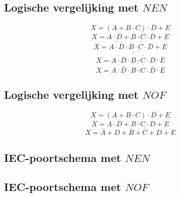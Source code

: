 \documentclass[11pt, a4paper]{report}
\begin{document}
\subsection*{Logische vergelijking met $NEN$}

\begin{equation*}
X = (A + B\cdot C)\cdot \overline{D} + E
\end{equation*}
\begin{equation*}
X = A \cdot \overline{D} + B \cdot C \cdot \overline{D} + E
\end{equation*}
\begin{equation*}
X = \overline{\overline{A \cdot \overline{D}}\cdot \overline{B \cdot C \cdot \overline{D}}}+ E
\end{equation*}
\begin{equation*}
X = \overline{\overline{\overline{\overline{A \cdot \overline{D}}\cdot \overline{B \cdot C \cdot \overline{D}}}} \cdot \overline{E}}
\end{equation*}
\begin{equation*}
X = \overline{\overline{A \cdot \overline{D}}\cdot \overline{B \cdot C \cdot \overline{D}} \cdot \overline{E}}
\end{equation*}

\subsection*{Logische vergelijking met $NOF$}
\begin{equation*}
X = (A + B\cdot C)\cdot \overline{D} + E
\end{equation*}
\begin{equation*}
X = A \cdot \overline{D} + B \cdot C \cdot \overline{D} + E
\end{equation*}
\begin{equation*}
X = \overline{ \overline{A} + D } + \overline{ \overline{B} + \overline{C} + D} + E
\end{equation*}

\subsection*{IEC-poortschema met $NEN$}

\vspace{10 cm}

\subsection*{IEC-poortschema met $NOF$}
\end{document}
